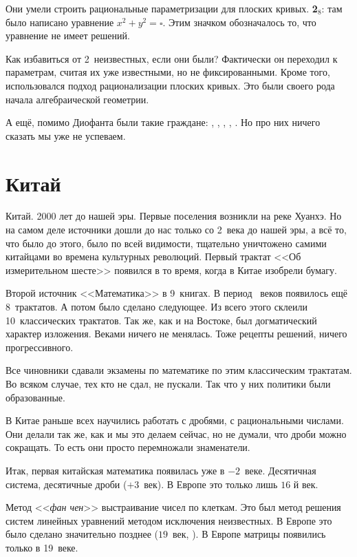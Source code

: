 \documentclass[a4paper,oneside,fleqn,10pt]{article}
\begin{document}
Они умели строить рациональные параметризации для плоских кривых.
\textbf{2}$_8$: там было написано уравнение $x^2 + y^2 = \square$.
Этим значком обозначалось то, что уравнение не имеет решений.

Как избавиться от 2~неизвестных, если они были? Фактически он переходил к параметрам,
считая их уже известными, но не фиксированными. Кроме того, использовался подход
рационализации плоских кривых. Это были своего рода начала алгебраической геометрии.

А ещё, помимо Диофанта были такие граждане:
, , , , .
Но про них ничего сказать мы уже не успеваем.


\section{Китай}


Китай. 2000 лет до нашей эры. Первые поселения возникли на реке Хуанхэ.
Но на самом деле источники дошли до нас только со 2~века до нашей эры,
а всё то, что было до этого, было по всей видимости, тщательно уничтожено
самими китайцами во времена культурных революций.
Первый трактат <<Об измерительном шесте>>
появился в то время, когда в Китае изобрели бумагу.

Второй источник <<Математика>> в 9~книгах. В период ~веков появилось ещё 8~трактатов.
А потом было сделано следующее. Из всего этого склеили 10~классических трактатов.
Так же, как и на Востоке, был догматический характер изложения.
Веками ничего не менялась. Тоже рецепты решений, ничего прогрессивного.

Все чиновники сдавали экзамены по математике по этим классическим трактатам.
Во всяком случае, тех кто не сдал, не пускали. Так что у них политики были образованные.

В Китае раньше всех научились работать с дробями, с рациональными числами.
Они делали так же, как и мы это делаем сейчас, но не думали, что дроби можно сокращать.
То есть они просто перемножали знаменатели.

Итак, первая китайская математика появилась уже в $-2$~веке.
Десятичная система, десятичные дроби ($+3$~век).
В Европе это только лишь $16$ й век.

Метод <<\emph{фан чен}>> выстраивание чисел по клеткам.
Это был метод решения систем линейных уравнений методом исключения
неизвестных. В Европе это было сделано значительно позднее ($19$~век, ).
В Европе матрицы появились только в 19~веке.
\end{document}
